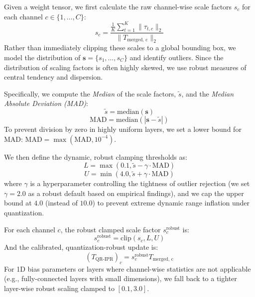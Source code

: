 \documentclass{article}
\theoremstyle{plain}
\theoremstyle{definition}
\theoremstyle{remark}
\begin{document}
Given a weight tensor, we first calculate the raw channel-wise scale factors $s_c$ for each channel $c \in \{1, \dots, C\}$:
\begin{equation}
    s_c = \frac{\frac{1}{K} \sum_{t=1}^{K} \|\tau_{t, c}\|_2}{\|T_{\text{merged, c}}\|_2}
\end{equation}
Rather than immediately clipping these scales to a global bounding box, we model the distribution of $\mathbf{s} = \{s_1, \dots, s_C\}$ and identify outliers. Since the distribution of scaling factors is often highly skewed, we use robust measures of central tendency and dispersion.

Specifically, we compute the \emph{Median} of the scale factors, $\tilde{s}$, and the \emph{Median Absolute Deviation (MAD)}:
\begin{equation}
    \tilde{s} = \text{median}(\mathbf{s})
\end{equation}
\begin{equation}
    \text{MAD} = \text{median}(|\mathbf{s} - \tilde{s}|)
\end{equation}
To prevent division by zero in highly uniform layers, we set a lower bound for MAD: $\text{MAD} = \max(\text{MAD}, 10^{-4})$.

We then define the dynamic, robust clamping thresholds as:
\begin{equation}
    L = \max(0.1, \tilde{s} - \gamma \cdot \text{MAD})
\end{equation}
\begin{equation}
    U = \min(4.0, \tilde{s} + \gamma \cdot \text{MAD})
\end{equation}
where $\gamma$ is a hyperparameter controlling the tightness of outlier rejection (we set $\gamma = 2.0$ as a robust default based on empirical findings), and we cap the upper bound at $4.0$ (instead of $10.0$) to prevent extreme dynamic range inflation under quantization.

For each channel $c$, the robust clamped scale factor $s_c^{\text{robust}}$ is:
\begin{equation}
    s_c^{\text{robust}} = \text{clip}(s_c, L, U)
\end{equation}
And the calibrated, quantization-robust update is:
\begin{equation}
    (T_{\text{QR-IPR}})_c = s_c^{\text{robust}} T_{\text{merged, c}}
\end{equation}
For 1D bias parameters or layers where channel-wise statistics are not applicable (e.g., fully-connected layers with small dimensions), we fall back to a tighter layer-wise robust scaling clamped to $[0.1, 3.0]$.
\end{document}
